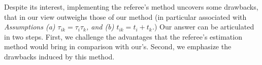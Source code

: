 \documentclass[a4paper,11pt]{article}
\begin{document}
Despite its interest, implementing the referee's method uncovers some drawbacks, that in our view outweighs those of our method (in particular associated with \textit{Assumptions (a) $\tau_{ik} = \tau_i\tau_{k}$, and (b) $t_{ik} = t_i+ t_{k}$.}) Our answer can be articulated in two steps. First, we challenge the advantages that the referee's estimation method would bring in comparison with our's. Second, we emphasize the drawbacks induced by this method. \smallskip
%
%
%
%
%
%
\end{document}
